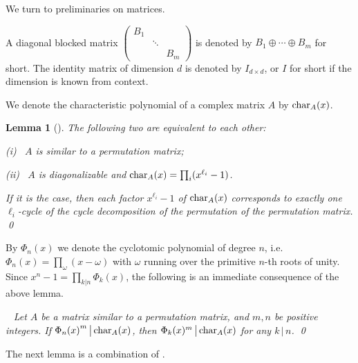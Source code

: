 \documentclass{article}
\newtheorem{lemma}[theorem]{Lemma}
\numberwithin{equation}{section}
\begin{document}
We turn to preliminaries on matrices.

A diagonal blocked matrix $\begin{pmatrix}B_1\\ & \ddots\\ &&B_m\end{pmatrix}$
is denoted by $B_1\oplus\cdots\oplus B_m$ for short.
The identity matrix of dimension $d$ is denoted by $I_{d\times d}$, or
$I$ for short if the dimension is known from context.

We denote the characteristic polynomial of a
complex matrix $A$ by ${\rm char}_A(x)$.

\begin{lemma}[{\cite[Lemma 2.1]{DF}}]\label{permutable}
The following two are equivalent to each other:

(i)~  $A$ is similar to a permutation matrix;

(ii)~ $A$ is diagonalizable and ${\rm char}_A(x)=\prod_{i}(x^{\ell_i}-1)$.

\noindent
If it is the case, then each factor $x^{\ell_i}-1$ of ${\rm char}_A(x)$
corresponds to exactly one $\ell_i$-cycle of the cycle decomposition
of the permutation of the permutation matrix. \qed
\end{lemma}

By $\Phi_n(x)$ we denote the cyclotomic polynomial of degree $n$, i.e.
$\Phi_n(x)=\prod_{\omega}(x-\omega)$ with $\omega$ running over
the primitive $n$-th roots of unity. 
Since $x^n-1=\prod_{k|n}\Phi_k(x)$, 
the following is an immediate consequence of the above lemma.

\medskip{}~
{\it Let $A$ be a matrix similar to a permutation matrix, and
$m,n$ be positive integers. If ${\Phi_n(x)}^m\,\big|\,{\rm char}_A(x)$,
then $\Phi_k(x)^m\,\big|\,{\rm char}_A(x)$ for any $k\,|\,n$.
\qed
}

\medskip
The next lemma is a combination of
\cite[Eqns (2.1), (2.2), (2.3) and (2.4)]{DF}.
\end{document}
